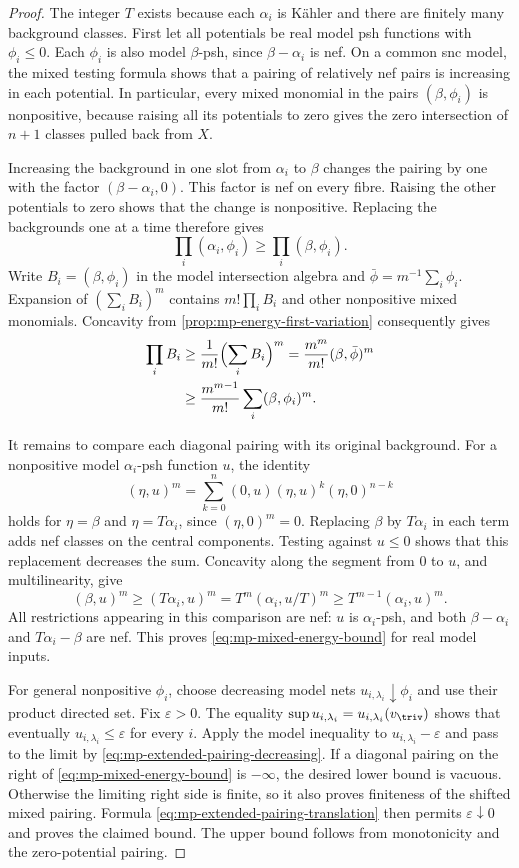 \begin{proof}
The integer $T$ exists because each $\alpha_i$ is K\"ahler and there are finitely many background classes. First let all potentials be real model psh functions with $\phi_i\leq0$. Each $\phi_i$ is also model $\beta$-psh, since $\beta-\alpha_i$ is nef. On a common snc model, the mixed testing formula shows that a pairing of relatively nef pairs is increasing in each potential. In particular, every mixed monomial in the pairs $(\beta,\phi_i)$ is nonpositive, because raising all its potentials to zero gives the zero intersection of $n+1$ classes pulled back from $X$.

Increasing the background in one slot from $\alpha_i$ to $\beta$ changes the pairing by one with the factor $(\beta-\alpha_i,0)$. This factor is nef on every fibre. Raising the other potentials to zero shows that the change is nonpositive. Replacing the backgrounds one at a time therefore gives
\[
           \prod_i(\alpha_i,\phi_i)\geq\prod_i(\beta,\phi_i).
\]
Write $B_i=(\beta,\phi_i)$ in the model intersection algebra and $\bar\phi=m^{-1}\sum_i\phi_i$. Expansion of $(\sum_iB_i)^m$ contains $m!\prod_iB_i$ and other nonpositive mixed monomials. Concavity from \cref{prop:mp-energy-first-variation} consequently gives
\[
 \begin{aligned}
 \prod_iB_i
 &\geq\frac1{m!}\Bigl(\sum_iB_i\Bigr)^m
   =\frac{m^m}{m!}(\beta,\bar\phi)^m\\
 &\geq\frac{m^{m-1}}{m!}\sum_i(\beta,\phi_i)^m.
 \end{aligned}
\]

It remains to compare each diagonal pairing with its original background. For a nonpositive model $\alpha_i$-psh function $u$, the identity
\[
 (\eta,u)^m
   =\sum_{k=0}^n(0,u)(\eta,u)^k(\eta,0)^{n-k}
\]
holds for $\eta=\beta$ and $\eta=T\alpha_i$, since $(\eta,0)^m=0$. Replacing $\beta$ by $T\alpha_i$ in each term adds nef classes on the central components. Testing against $u\leq0$ shows that this replacement decreases the sum. Concavity along the segment from $0$ to $u$, and multilinearity, give
\[
 (\beta,u)^m\geq(T\alpha_i,u)^m
       =T^m(\alpha_i,u/T)^m
       \geq T^{m-1}(\alpha_i,u)^m.
\]
All restrictions appearing in this comparison are nef: $u$ is $\alpha_i$-psh, and both $\beta-\alpha_i$ and $T\alpha_i-\beta$ are nef. This proves \eqref{eq:mp-mixed-energy-bound} for real model inputs.

For general nonpositive $\phi_i$, choose decreasing model nets $u_{i,\lambda_i}\downarrow\phi_i$ and use their product directed set. Fix $\varepsilon>0$. The equality $\sup u_{i,\lambda_i}=u_{i,\lambda_i}(v_{\triv})$ shows that eventually $u_{i,\lambda_i}\leq\varepsilon$ for every $i$. Apply the model inequality to $u_{i,\lambda_i}-\varepsilon$ and pass to the limit by \eqref{eq:mp-extended-pairing-decreasing}. If a diagonal pairing on the right of \eqref{eq:mp-mixed-energy-bound} is $-\infty$, the desired lower bound is vacuous. Otherwise the limiting right side is finite, so it also proves finiteness of the shifted mixed pairing. Formula \eqref{eq:mp-extended-pairing-translation} then permits $\varepsilon\downarrow0$ and proves the claimed bound. The upper bound follows from monotonicity and the zero-potential pairing.


\end{proof}
